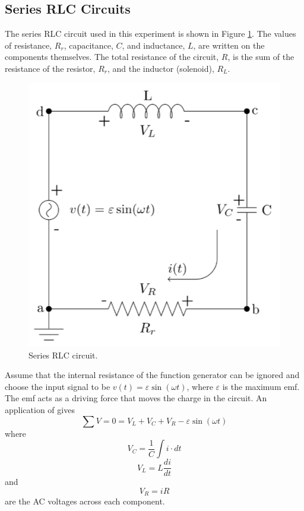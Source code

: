 \documentclass[12pt, a4paper, oneside, openright, titlepage]{book}
\begin{document}
\subsection{Series RLC Circuits}

The series RLC circuit used in this experiment is shown in Figure \ref{fig:Res2}. The values of resistance, $R_r$, capacitance, $C$, and inductance, $L$, are written on the components themselves. The total resistance of the circuit, $R$, is the sum of the resistance of the resistor, $R_r$, and the inductor (solenoid), $R_L$.

\begin{figure}[H]
    \centering
    \includegraphics[scale = 0.8]{Images/Res2.PNG}
    \caption{Series RLC circuit.}
    \label{fig:Res2}
\end{figure}

Assume that the internal resistance of the function generator can be ignored and choose the input signal to be $v(t) = \varepsilon\sin(\omega t)$, where $\varepsilon$ is the maximum emf. The emf acts as a driving force that moves the charge in the circuit. An application of  gives \begin{equation}\label{eq:Res1}
    \sum V = 0 = V_L + V_C + V_R - \varepsilon\sin(\omega t)
\end{equation}
where \begin{equation}\label{eq:Res2}
    V_C = \frac{1}{C}\int i\cdot dt 
\end{equation}
\begin{equation}\label{eq:Res3}
    V_L = L\frac{di}{dt}
\end{equation}
and \begin{equation}\label{eq:Res4}
    V_R = iR
\end{equation}
are the AC voltages across each component.
\end{document}
